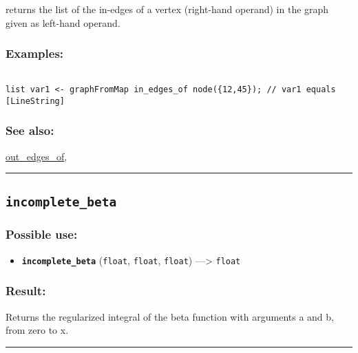 \documentclass[]{book}
\providecommand{\tightlist}{%
  \setlength{\itemsep}{0pt}\setlength{\parskip}{0pt}}
\theoremstyle{definition}
\theoremstyle{definition}
\theoremstyle{definition}
\theoremstyle{remark}
\begin{document}
returns the list of the in-edges of a vertex (right-hand operand) in the
graph given as left-hand operand.

\subsubsection{Examples:}\label{examples-206}

\begin{verbatim}
 
list var1 <- graphFromMap in_edges_of node({12,45}); // var1 equals [LineString]
\end{verbatim}

\subsubsection{See also:}\label{see-also-116}

\href{OperatorsNR\#out_edges_of}{out\_edges\_of},

\begin{center}\rule{0.5\linewidth}{\linethickness}\end{center}

\subsection{\texorpdfstring{\texttt{incomplete\_beta}}{incomplete\_beta}}\label{incomplete_beta}

\subsubsection{Possible use:}\label{possible-use-269}

\begin{itemize}
\tightlist
\item
  \textbf{\texttt{incomplete\_beta}} (\texttt{float}, \texttt{float},
  \texttt{float}) ---\textgreater{} \texttt{float}
\end{itemize}

\subsubsection{Result:}\label{result-259}

Returns the regularized integral of the beta function with arguments a
and b, from zero to x.

\begin{center}\rule{0.5\linewidth}{\linethickness}\end{center}
\end{document}
